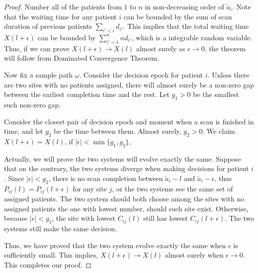 \begin{proof}
Number all of the patients from $1$ to $n$ in non-decreasing order of $\tilde a_i$.
Note that the waiting time for any patient $i$ can be bounded
by the sum of scan duration of previous patients $\sum_{i' < i} d_{i'}$.
This implies that the total waiting time $X(l+\epsilon)$
can be bounded by $\sum_{i'=1}^n nd_{i'}$, which is
a integrable random variable. Thus, if we can prove
$X(l+\epsilon) \rightarrow X(l)$ almost surely
as $\epsilon \rightarrow 0$, the theorem will follow from
Dominated Convergence Theorem.

Now fix a sample path $\omega$. Consider the decision epoch for patient $i$.
Unless there are two sites with no patients assigned, there will almost surely
be a non-zero gap between the earliest completion time and the rest.
Let $g_1>0$ be the smallest such non-zero gap.

Consider the closest pair of decision epoch and moment when a scan
is finished in time, and let $g_2$ be the time between them.
Almost surely, $g_2 > 0$. We claim $X(l+\epsilon)=X(l)$,
if $|\epsilon| < \min\{g_1, g_2\}$,

Actually, we will prove the two systems will evolve exactly the same.
Suppose that on the contrary, the two systems diverge when
making decisions for patient $i$. Since $|\epsilon| < g_2$,
there is no scan completion between $\tilde a_i -l$ and
$\tilde a_i-\epsilon$, thus $P_{ij}(l) = P_{ij}(l+\epsilon)$ for any site $j$,
or the two systems see the same set of assigned patients.
The two system should both choose among the sites with no assigned patients
the one with lowest number, should such site exist.
Otherwise, because $|\epsilon| < g_1$, the site with lowest $C_{ij}(l)$
still has lowest $C_{ij}(l+\epsilon)$. The two systems still
make the same decision.

Thus, we have proved that the two system evolve
exactly the same when $\epsilon$ is sufficiently small.
This implies, $X(l+\epsilon) \rightarrow X(l)$ almost surely
when $\epsilon \rightarrow 0$. This completes our proof.
\end{proof}
